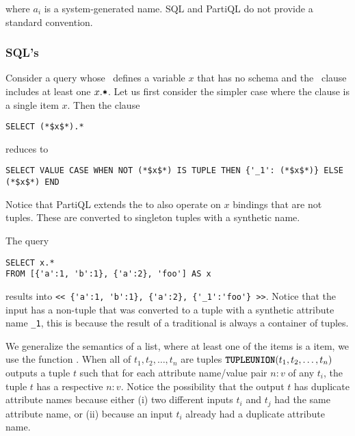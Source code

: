 \noindent where $a_i$ is a system-generated name. SQL and PartiQL do not
provide a standard convention. 

\subsubsection{SQL's \gl{*}} 
\label{sec:sql-star}

Consider a query whose \from\ defines a variable $x$ that has no schema and the
\select\ clause includes at least one $x.\texttt{\textbf{*}}$. Let us first consider the
simpler case where the  clause is a single item $x$. Then the
clause

\begin{lstlisting}
SELECT (*$x$*).*
\end{lstlisting}

\noindent reduces to

\begin{lstlisting}
SELECT VALUE CASE WHEN NOT (*$x$*) IS TUPLE THEN {'_1': (*$x$*)} ELSE (*$x$*) END 
\end{lstlisting}

\noindent Notice that PartiQL extends the  to also operate on $x$
bindings that are not tuples. These are converted to singleton tuples with a
synthetic name.

\begin{example}
The query

\begin{lstlisting}
SELECT x.*
FROM [{'a':1, 'b':1}, {'a':2}, 'foo'] AS x
\end{lstlisting}

\noindent results into \lstinline|<< {'a':1, 'b':1}, {'a':2}, {'_1':'foo'} >>|.
Notice that the input has a non-tuple that was converted to a tuple with a
synthetic attribute name \lstinline|_1|, this is because the result of a
traditional  is always a container of tuples.
\end{example}

We generalize the semantics of a  list, where at least one of the
items is a  item, we use the function \tupleunion. When all of $t_1, t_2,
\ldots, t_n$ are tuples $\texttt{\textbf{TUPLEUNION}}(t_1, t_2,\ldots,t_n)$ outputs a tuple $t$
such that for each attribute name/value pair $n:v$ of any $t_i$, the tuple $t$
has a respective $n:v$. Notice the possibility that the output $t$ has duplicate
attribute names because either (i) two different inputs $t_i$ and $t_j$ had the
same attribute name, or (ii) because an input $t_i$ already had a duplicate
attribute name. 

